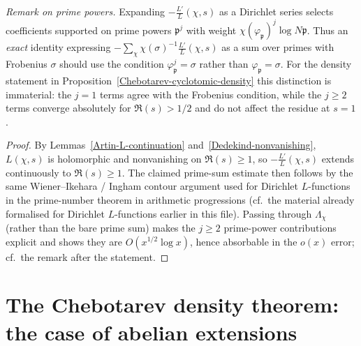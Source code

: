 \documentclass[10pt,a4paper]{article}
\newcommand{\uses}[1]{}
\theoremstyle{definition}
\begin{document}
\emph{Remark on prime powers.}
Expanding $-\frac{L'}{L}(\chi,s)$ as a Dirichlet series selects coefficients supported on
prime powers $\mathfrak{p}^j$ with weight $\chi(\varphi_{\mathfrak{p}})^j\log N\mathfrak{p}$.
Thus an \emph{exact} identity expressing $-\sum_\chi \chi(\sigma)^{-1}\frac{L'}{L}(\chi,s)$ as a
sum over primes with Frobenius $\sigma$ should use the condition $\varphi_{\mathfrak{p}}^j=\sigma$
rather than $\varphi_{\mathfrak{p}}=\sigma$.  For the density statement in
Proposition~\ref{Chebotarev-cyclotomic-density} this distinction is immaterial: the $j=1$ terms
agree with the Frobenius condition, while the $j\geq 2$ terms converge absolutely for
$\Re(s)>1/2$ and do not affect the residue at $s=1$.
\begin{proof}\uses{Dedekind-nonvanishing, Artin-L-continuation}
By Lemmas~\ref{Artin-L-continuation} and~\ref{Dedekind-nonvanishing}, $L(\chi,s)$ is holomorphic
and nonvanishing on $\Re(s)\geq 1$, so $-\frac{L'}{L}(\chi,s)$ extends continuously to
$\Re(s)\geq 1$.  The claimed prime-sum estimate then follows by the same Wiener--Ikehara /
Ingham contour argument used for Dirichlet $L$-functions in the prime-number theorem in
arithmetic progressions (cf.\ the material already formalised for Dirichlet $L$-functions
earlier in this file).  Passing through $\Lambda_\chi$ (rather than the bare prime sum) makes
the $j\geq 2$ prime-power contributions explicit and shows they are $O(x^{1/2}\log x)$,
hence absorbable in the $o(x)$ error; cf.\ the remark after the statement.
\end{proof}
\section{The Chebotarev density theorem: the case of abelian extensions}
\end{document}
